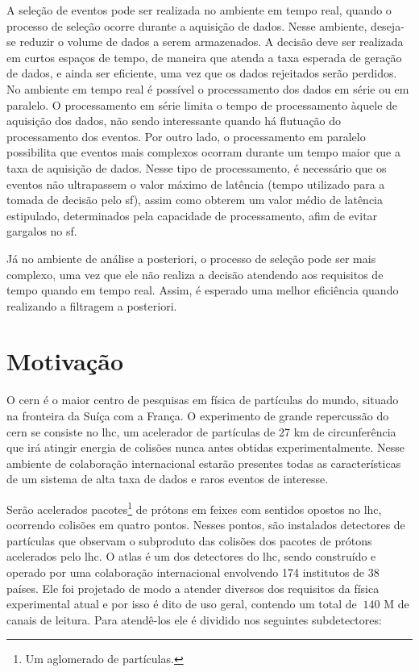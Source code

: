A seleção de eventos pode ser realizada no ambiente em tempo real,
quando o processo de seleção ocorre durante a aquisição de dados. Nesse
ambiente, deseja-se reduzir o volume de dados a serem armazenados. A decisão deve ser realizada 
em curtos espaços de tempo, de maneira que atenda a taxa esperada de geração de
dados, e ainda ser eficiente, uma vez que os dados rejeitados serão perdidos. 
No ambiente em tempo real é possível o processamento dos dados em série
ou em paralelo. O processamento em série limita o tempo de processamento àquele
de aquisição dos dados, não sendo interessante quando há flutuação do
processamento dos eventos. Por outro lado, o processamento em
paralelo possibilita que eventos mais complexos ocorram durante um tempo maior
que a taxa de aquisição de dados. Nesse tipo de processamento, é necessário que
os eventos não ultrapassem o valor máximo de latência (tempo utilizado
para a tomada de decisão pelo \glsdesc{sf}), assim como obterem um valor 
médio de latência estipulado, determinados pela capacidade de processamento,
afim de evitar gargalos no \glsdesc{sf}.

Já no ambiente de análise a posteriori, o processo de seleção pode ser mais
complexo, uma vez que ele não realiza a decisão atendendo aos
requisitos de tempo quando em tempo real. Assim, é esperado 
uma melhor eficiência quando realizando a filtragem a posteriori.

\section{Motivação}

O \gls{cern} é o maior centro de
pesquisas em física de partículas do mundo, situado na fronteira da Suíça com a
França. O experimento de grande repercussão do \gls{cern} se
consiste no \gls{lhc}, um acelerador de partículas de 27 km de
circunferência que irá atingir energia de colisões nunca antes obtidas
experimentalmente. 
Nesse ambiente de colaboração internacional estarão presentes
todas as características de um sistema de alta taxa de dados e raros eventos de
interesse.

Serão acelerados pacotes\footnote{Um aglomerado de partículas.} de prótons em
feixes com sentidos opostos no \gls{lhc},
ocorrendo colisões em quatro pontos. Nesses pontos, são instalados 
detectores de partículas que observam o subproduto das colisões dos pacotes de prótons 
acelerados pelo \gls{lhc}. O \gls{atlas} é um dos detectores do
\gls{lhc}, sendo construído e operado por uma colaboração internacional envolvendo 174 institutos de 38
países. Ele foi projetado de modo a atender diversos dos requisitos da física 
experimental atual e por isso é dito de uso geral, contendo um total de $~140$ M 
de canais de leitura. Para atendê-los ele é dividido nos seguintes subdetectores:

